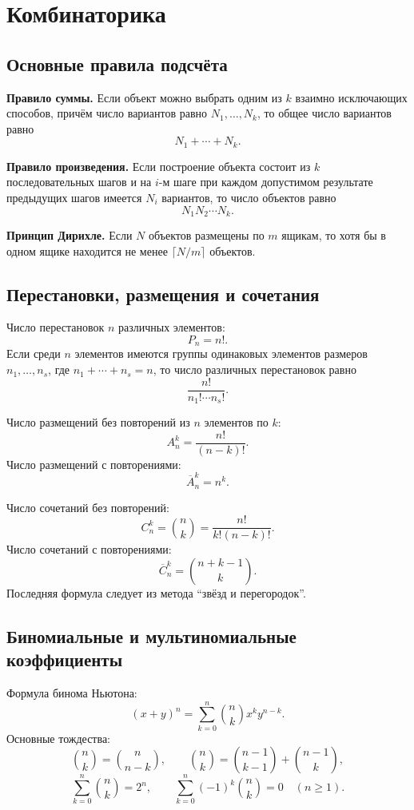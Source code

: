 \section{Комбинаторика}
\label{sec:combinatorics}

\subsection{Основные правила подсчёта}

\textbf{Правило суммы.} Если объект можно выбрать одним из $k$ взаимно
исключающих способов, причём число вариантов равно $N_1,\ldots,N_k$, то общее
число вариантов равно
\[
    N_1+\cdots+N_k.
\]

\textbf{Правило произведения.} Если построение объекта состоит из $k$
последовательных шагов и на $i$-м шаге при каждом допустимом результате
предыдущих шагов имеется $N_i$ вариантов, то число объектов равно
\[
    N_1N_2\cdots N_k.
\]

\textbf{Принцип Дирихле.} Если $N$ объектов размещены по $m$ ящикам, то хотя бы
в одном ящике находится не менее $\lceil N/m\rceil$ объектов.

\subsection{Перестановки, размещения и сочетания}

Число перестановок $n$ различных элементов:
\[
    P_n=n!.
\]
Если среди $n$ элементов имеются группы одинаковых элементов размеров
$n_1,\ldots,n_s$, где $n_1+\cdots+n_s=n$, то число различных перестановок равно
\[
    \frac{n!}{n_1!\cdots n_s!}.
\]

Число размещений без повторений из $n$ элементов по $k$:
\[
    A_n^k=\frac{n!}{(n-k)!}.
\]
Число размещений с повторениями:
\[
    \overline{A}_n^k=n^k.
\]

Число сочетаний без повторений:
\[
    C_n^k=\binom{n}{k}=\frac{n!}{k!(n-k)!}.
\]
Число сочетаний с повторениями:
\[
    \overline{C}_n^k=\binom{n+k-1}{k}.
\]
Последняя формула следует из метода ``звёзд и перегородок''.

\subsection{Биномиальные и мультиномиальные коэффициенты}

Формула бинома Ньютона:
\[
    (x+y)^n=\sum_{k=0}^{n}\binom{n}{k}x^k y^{n-k}.
\]
Основные тождества:
\[
    \binom{n}{k}=\binom{n}{n-k},
    \qquad
    \binom{n}{k}=\binom{n-1}{k-1}+\binom{n-1}{k},
\]
\[
    \sum_{k=0}^{n}\binom{n}{k}=2^n,
    \qquad
    \sum_{k=0}^{n}(-1)^k\binom{n}{k}=0\quad(n\geq1).
\]

